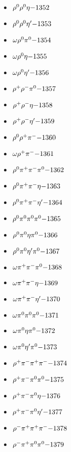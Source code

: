 \begin{multicols}{3}
\begin{itemize}
 \item $ \rho^{0} \rho^{0} \eta \hfill{-1352}$
 \item $ \rho^{0} \rho^{0} {\eta^{\prime}} \hfill{-1353}$
 \item $ \omega \rho^{0} \pi^{0} \hfill{-1354}$
 \item $ \omega \rho^{0} \eta \hfill{-1355}$
 \item $ \omega \rho^{0} {\eta^{\prime}} \hfill{-1356}$
 \item $ \rho^{+} \rho^{-} \pi^{0} \hfill{-1357}$
 \item $ \rho^{+} \rho^{-} \eta \hfill{-1358}$
 \item $ \rho^{+} \rho^{-} {\eta^{\prime}} \hfill{-1359}$
 \item $ \rho^{0} \rho^{+} \pi^{-} \hfill{-1360}$
 \item $ \omega \rho^{+} \pi^{-} \hfill{-1361}$
 \item $ \rho^{0} \pi^{+} \pi^{-} \pi^{0} \hfill{-1362}$
 \item $ \rho^{0} \pi^{+} \pi^{-} \eta \hfill{-1363}$
 \item $ \rho^{0} \pi^{+} \pi^{-} {\eta^{\prime}} \hfill{-1364}$
 \item $ \rho^{0} \pi^{0} \pi^{0} \pi^{0} \hfill{-1365}$
 \item $ \rho^{0} \pi^{0} \eta \pi^{0} \hfill{-1366}$
 \item $ \rho^{0} \pi^{0} {\eta^{\prime}} \pi^{0} \hfill{-1367}$
 \item $ \omega \pi^{+} \pi^{-} \pi^{0} \hfill{-1368}$
 \item $ \omega \pi^{+} \pi^{-} \eta \hfill{-1369}$
 \item $ \omega \pi^{+} \pi^{-} {\eta^{\prime}} \hfill{-1370}$
 \item $ \omega \pi^{0} \pi^{0} \pi^{0} \hfill{-1371}$
 \item $ \omega \pi^{0} \eta \pi^{0} \hfill{-1372}$
 \item $ \omega \pi^{0} {\eta^{\prime}} \pi^{0} \hfill{-1373}$
 \item $ \rho^{+} \pi^{-} \pi^{+} \pi^{-} \hfill{-1374}$
 \item $ \rho^{+} \pi^{-} \pi^{0} \pi^{0} \hfill{-1375}$
 \item $ \rho^{+} \pi^{-} \pi^{0} \eta \hfill{-1376}$
 \item $ \rho^{+} \pi^{-} \pi^{0} {\eta^{\prime}} \hfill{-1377}$
 \item $ \rho^{-} \pi^{+} \pi^{+} \pi^{-} \hfill{-1378}$
 \item $ \rho^{-} \pi^{+} \pi^{0} \pi^{0} \hfill{-1379}$

\end{itemize}
\end{multicols}
